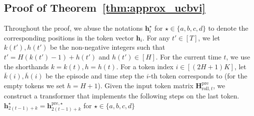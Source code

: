 \documentclass[10pt]{article}
\renewcommand{\bar}{\overline}
\newcommand{\<}{\left\langle}
\renewcommand{\>}{\right\rangle}
\newcommand{\pre}{{\mathrm{pre}}}
\newcommand{\parta}{{a}}
\newcommand{\partb}{{b}}
\newcommand{\partc}{{c}}
\newcommand{\partd}{{d}}
\newcommand{\totlen}{{T}}
\newcommand{\Numepi}{{K}}
\newcommand{\horizon}{{H}}
\renewcommand{\horizon}{{H}}
\newcommand{\roll}{{\mathrm{roll}}}
\def\bH{{\mathbf H}}
\def\bh{{\mathbf h}}
\begin{document}
\subsection{Proof of Theorem~\ref{thm:approx_ucbvi}}\label{sec:pf_approx_ucbvi}
Throughout the proof, we abuse the notations $\bh_i^{\star}$ for $\star\in\{\parta,\partb,\partc,\partd\}$ to denote the corresponding positions in the token vector $\bh_i$. For any $t'\in[\totlen]$, we let $k(t'),h(t')$ be the non-negative integers such that $t'=\horizon(k(t')-1)+h(t')$ and $h(t')\in[\horizon]$. For the current time $t$, we use the shorthands $k=k(t),h=h(t)$.  For a token index $i\in[(2\horizon+1)\Numepi]$, let $\bar{k}(i),\bar{h}(i)$ be the episode and time step the $i$-th token corresponds to (for the empty tokens we set $h=\horizon+1$).
Given the input token matrix $\bH^\pre_{\roll,t}$, we construct a transformer that implements the following steps on the last token.
$\bh^{\star}_{2(t-1)+k}=\bh^{\pre,\star}_{2(t-1)+k}$ for $\star\in\{\parta,\partb,\partc,\partd\}$
\end{document}
